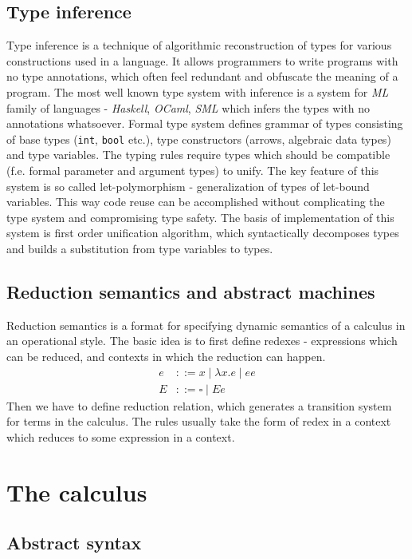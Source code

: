 \documentclass[inz, english, shortabstract]{iithesis}
\begin{document}
\section{Type inference}
Type inference is a technique of algorithmic reconstruction of types for various constructions used in a language.
It allows programmers to write programs with no type annotations, which often feel redundant and obfuscate the meaning of a program.
The most well known type system with inference is a system for \emph{ML} family of languages - \emph{Haskell}, \emph{OCaml}, \emph{SML} which infers the types with no annotations whatsoever.
Formal type system defines grammar of types consisting of base types (\texttt{int}, \texttt{bool} etc.), type constructors (arrows, algebraic data types) and type variables.
The typing rules require types which should be compatible (f.e. formal parameter and argument types) to unify.
The key feature of this system is so called let-polymorphism - generalization of types of let-bound variables.
This way code reuse can be accomplished without complicating the type system and compromising type safety.
The basis of implementation of this system is first order unification algorithm, which syntactically decomposes types and builds a substitution from type variables to types.

\section{Reduction semantics and abstract machines}
Reduction semantics is a format for specifying dynamic semantics of a calculus in an operational style.
The basic idea is to first define redexes - expressions which can be reduced, and contexts in which the reduction can happen.
\begin{align*}
  e &::= x \mid \lambda x . e \mid e e \\
  E &::= \square \mid E e
\end{align*}
Then we have to define reduction relation, which generates a transition system for terms in the calculus.
The rules usually take the form of redex in a context which reduces to some expression in a context.

\chapter{The calculus}

\section{Abstract syntax}
\end{document}

